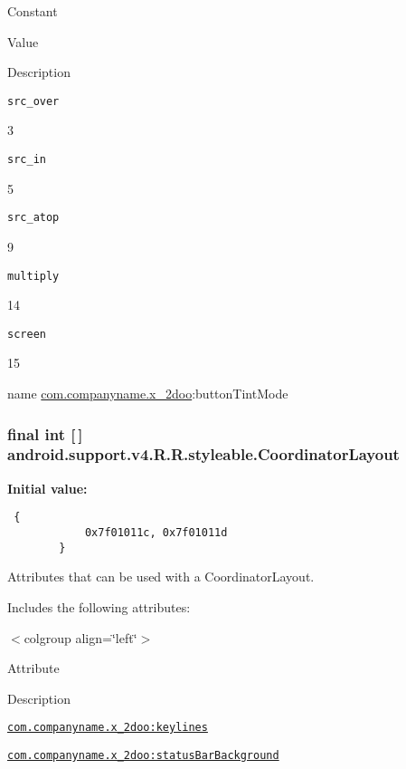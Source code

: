 Constant

Value

Description 

{\tt src\_\-over}

3

{\tt src\_\-in}

5

{\tt src\_\-atop}

9

{\tt multiply}

14

{\tt screen}

15

name \hyperlink{namespacecom_1_1companyname_1_1x__2doo}{com.companyname.x\_\-2doo}:buttonTintMode \hypertarget{classandroid_1_1support_1_1v4_1_1_r_1_1styleable_435a678f97c5e5874614dce39be62fcb}{
\subsubsection[{CoordinatorLayout}]{\setlength{\rightskip}{0pt plus 5cm}final int \mbox{[}$\,$\mbox{]} android.support.v4.R.R.styleable.CoordinatorLayout}}
\label{classandroid_1_1support_1_1v4_1_1_r_1_1styleable_435a678f97c5e5874614dce39be62fcb}


\textbf{Initial value:}

\begin{Code}\begin{verbatim} {
            0x7f01011c, 0x7f01011d
        }
\end{verbatim}
\end{Code}
Attributes that can be used with a CoordinatorLayout. 

Includes the following attributes: \begin{TabularC}{0}
\hline
\end{TabularC}
$<$colgroup align=\char`\"{}left\char`\"{}$>$ 

Attribute

Description 

{\tt \hyperlink{classandroid_1_1support_1_1v4_1_1_r_1_1styleable_c20576c71d93334eef8aed7debc2efde}{com.companyname.x\_\-2doo:keylines}}

{\tt \hyperlink{classandroid_1_1support_1_1v4_1_1_r_1_1styleable_e232b9f25b14bea864d27c7645390f60}{com.companyname.x\_\-2doo:statusBarBackground}}

